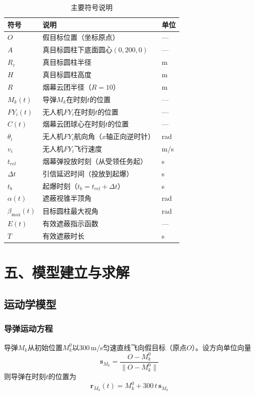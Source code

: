 \documentclass[12pt,a4paper]{article}
\begin{document}
\begin{table}[H]
\centering
\caption{主要符号说明}
\begin{tabular}{lll}
\toprule
符号 & 说明 & 单位 \\
\midrule
$O$ & 假目标位置（坐标原点） & --- \\
$A$ & 真目标圆柱下底面圆心$(0,200,0)$ & --- \\
$R_c$ & 真目标圆柱半径 & m \\
$H$ & 真目标圆柱高度 & m \\
$R$ & 烟幕云团半径（$R=10$） & m \\
$M_k(t)$ & 导弹$M_k$在时刻$t$的位置 & --- \\
$FY_i(t)$ & 无人机$FY_i$在时刻$t$的位置 & --- \\
$C(t)$ & 烟幕云团球心在时刻$t$的位置 & --- \\
$\theta_i$ & 无人机$FY_i$航向角（$x$轴正向逆时针） & rad \\
$v_i$ & 无人机$FY_i$飞行速度 & m/s \\
$t_{rel}$ & 烟幕弹投放时刻（从受领任务起） & s \\
$\Delta t$ & 引信延迟时间（投放到起爆） & s \\
$t_b$ & 起爆时刻（$t_b = t_{rel} + \Delta t$） & s \\
$\alpha(t)$ & 遮蔽视锥半顶角 & rad \\
$\beta_{\max}(t)$ & 目标圆柱最大视角 & rad \\
$E(t)$ & 有效遮蔽指示函数 & --- \\
$T$ & 有效遮蔽时长 & s \\
\bottomrule
\end{tabular}
\end{table}

\section{五、模型建立与求解}

\subsection{运动学模型}

\subsubsection{导弹运动方程}

导弹$M_k$从初始位置$M_k^0$以300\,m/s匀速直线飞向假目标（原点$O$）。设方向单位向量
\begin{equation}
\mathbf{s}_{M_k} = \frac{O - M_k^0}{\|O - M_k^0\|}
\end{equation}
则导弹在时刻$t$的位置为
\begin{equation}
\mathbf{r}_{M_k}(t) = M_k^0 + 300 \, t \, \mathbf{s}_{M_k}
\end{equation}
\end{document}
